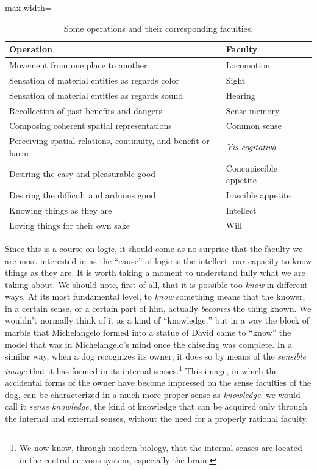 \documentclass[
  12pt,
]{memoir}
\begin{document}
\begin{table}[ht]
\begin{center}
\caption{Some operations and their corresponding faculties.}
\label{tab:operations-and-faculties}
\begin{adjustbox}{max width=\textwidth}
\begin{tabular}{l|l}
\toprule
Operation & Faculty \\
\midrule
Movement from one place to another & Locomotion \\
Sensation of material entities as regards color & Sight \\
Sensation of material entities as regards sound & Hearing \\
Recollection of past benefits and dangers & Sense memory \\
Composing coherent spatial representations & Common sense \\
Perceiving spatial relations, continuity, and benefit or harm & \emph{Vis cogitativa} \\
Desiring the easy and pleasurable good & Concupiscible appetite \\
Desiring the difficult and arduous good & Irascible appetite \\
Knowing things as they are & Intellect \\
Loving things for their own sake & Will \\
\bottomrule
\end{tabular}
\end{adjustbox}
\end{center}
\end{table}

Since this is a course on logic, it should come as no surprise that the
faculty we are most interested in as the ``cause'' of logic is the
intellect: our capacity to know things as they are. It is worth taking a
moment to understand fully what we are taking about. We should note,
first of all, that it is possible too \emph{know} in different ways. At
its most fundamental level, to \emph{know} something means that the
knower, in a certain sense, or a certain part of him, actually
\emph{becomes} the thing known. We wouldn't normally think of it as a
kind of ``knowledge,'' but in a way the block of marble that
Michelangelo formed into a statue of David came to ``know'' the model
that was in Michelangelo's mind once the chiseling was complete. In a
similar way, when a dog recognizes its owner, it does so by means of the
\emph{sensible image} that it has formed in its internal
senses.\footnote{We now know, through modern biology, that the internal
  senses are located in the central nervous system, especially the
  brain.} This image, in which the accidental forms of the owner have
become impressed on the sense faculties of the dog, can be characterized
in a much more proper sense as \emph{knowledge}: we would call it
\emph{sense knowledge}, the kind of knowledge that can be acquired only
through the internal and external senses, without the need for a
properly rational faculty.
\end{document}
